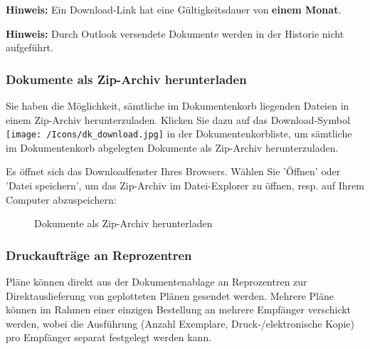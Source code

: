 \textbf{Hinweis:} Ein Download-Link hat eine Gültigkeitsdauer von \textbf{einem Monat}.

\vspace{\baselineskip}
\vspace{-10pt}

\textbf{Hinweis:} Durch Outlook versendete Dokumente werden in der Historie nicht aufgeführt.

\subsubsection{Dokumente als Zip-Archiv herunterladen}

Sie haben die Möglichkeit, sämtliche im Dokumentenkorb liegenden Dateien in einem Zip-Archiv herunterzuladen. Klicken Sie dazu auf das Download-Symbol \texttt{[image: /Icons/dk\_download.jpg]} in der Dokumentenkorbliste, um sämtliche im Dokumentenkorb abgelegten Dokumente als Zip-Archiv herunterzuladen.

\vspace{\baselineskip}

Es öffnet sich das Downloadfenster Ihres Browsers. Wählen Sie 'Öffnen' oder 'Datei speichern', um das Zip-Archiv im Datei-Explorer zu öffnen, resp. auf Ihrem Computer abzuspeichern:

\begin{figure}[H]
\caption{Dokumente als Zip-Archiv herunterladen}
\end{figure}

\subsubsection{Druckaufträge an Reprozentren}
\label{bkm:Ref20170609127}

Pläne können direkt aus der Dokumentenablage an Reprozentren zur Direktauslieferung von geplotteten Plänen gesendet werden. Mehrere Pläne können im Rahmen einer einzigen Bestellung an mehrere Empfänger verschickt werden, wobei die Ausführung (Anzahl Exemplare, Druck-/elektronische Kopie) pro Empfänger separat festgelegt werden kann.

